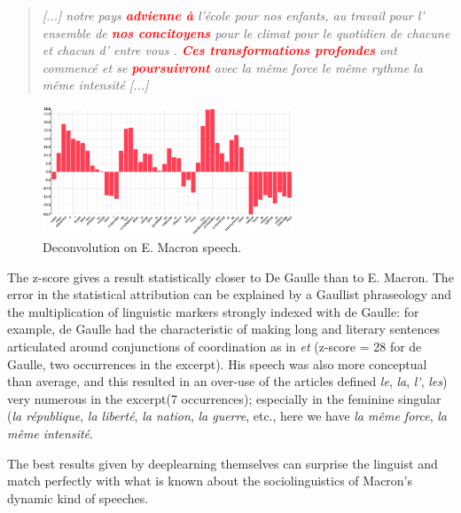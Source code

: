 \begin{quote}
\textit{[...] notre pays \textcolor{red}{\textbf{advienne à}} l'école pour nos enfants, au travail pour l' ensemble de \textcolor{red}{\textbf{nos concitoyens}} pour le climat pour le quotidien de chacune et chacun d' entre vous . \textcolor{red}{\textbf{Ces transformations profondes}} ont commencé et se \textcolor{red}{\textbf{poursuivront}} avec la même force le même rythme la même intensité [...]} 
\end{quote}

\begin{figure}[h]
\begin{center}
\includegraphics[width=7.5cm]{img/macron_activation.png}
\caption{Deconvolution on E. Macron speech.}
\label{macron_activation}
\end{center}
\end{figure}

The z-score gives a result statistically closer to De Gaulle than to E. Macron. The error in the statistical attribution can be explained by a Gaullist phraseology and the multiplication of linguistic markers strongly indexed with de Gaulle: for example, de Gaulle had the characteristic of making long and literary sentences articulated around conjunctions of coordination as in \textit{et} (z-score = 28 for de Gaulle, two occurrences in the excerpt). His speech was also more conceptual than average, and this resulted in an over-use of the articles defined \textit{le}, \textit{la}, \textit{l\'}, \textit{les}) very numerous in the excerpt(7 occurrences); especially in the feminine singular (\textit{la république}, \textit{la liberté}, \textit{la nation}, \textit{la guerre}, etc., here we have \textit{la même force}, \textit{la même intensité}.

The best results given by deeplearning themselves can surprise the linguist and match perfectly with what is known about the sociolinguistics of Macron's dynamic kind of speeches.

